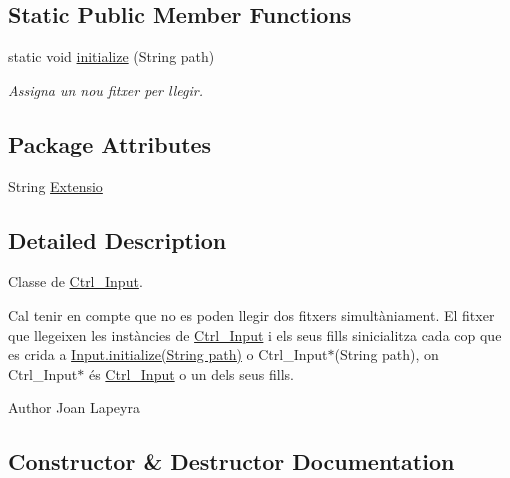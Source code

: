 \subsection*{Static Public Member Functions}
\begin{DoxyCompactItemize}
\item 
static void \hyperlink{classpersistencia_1_1input_1_1Ctrl__Input_a0b62b5bc05ac4a7fd919a49b201eb4fd}{initialize} (String path)
\begin{DoxyCompactList}\small\item\em Assigna un nou fitxer per llegir. \end{DoxyCompactList}\end{DoxyCompactItemize}
\subsection*{Package Attributes}
\begin{DoxyCompactItemize}
\item 
String \hyperlink{classpersistencia_1_1input_1_1Ctrl__Input_a6041b56aa31f01f75d02382f98e259e5}{Extensio}
\end{DoxyCompactItemize}


\subsection{Detailed Description}
Classe de \hyperlink{classpersistencia_1_1input_1_1Ctrl__Input}{Ctrl\+\_\+\+Input}. 

Cal tenir en compte que no es poden llegir dos fitxers simultàniament. El fitxer que llegeixen les instàncies de \hyperlink{classpersistencia_1_1input_1_1Ctrl__Input}{Ctrl\+\_\+\+Input} i els seus fills s\textquotesingle{}inicialitza cada cop que es crida a \hyperlink{classpersistencia_1_1input_1_1Input_abe53dec7aca98b94d0ec5e3200483513}{Input.\+initialize(\+String path)} o Ctrl\+\_\+\+Input$\ast$(String path), on Ctrl\+\_\+\+Input$\ast$ és \hyperlink{classpersistencia_1_1input_1_1Ctrl__Input}{Ctrl\+\_\+\+Input} o un dels seus fills. \begin{DoxyAuthor}{Author}
Joan Lapeyra 
\end{DoxyAuthor}


\subsection{Constructor \& Destructor Documentation}
\mbox{\label{classpersistencia_1_1input_1_1Ctrl__Input_a00f3fa14d0329d6e4b9ddbe39ada1258}} 
